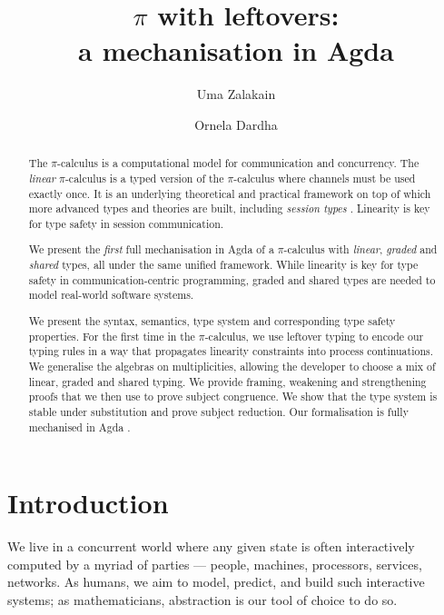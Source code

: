 \documentclass[a4paper,UKenglish,cleveref,autoref,thm-restate,authorcolumns]{lipics-v2019}
\title{$\pi$ with leftovers: \\ a mechanisation in Agda}
\author{Uma Zalakain}{University of Glasgow, Scotland}
       {u.zalakain.1@research.gla.ac.uk}{https://orcid.org/0000-0002-3268-9338}{}
\author{Ornela Dardha}{University of Glasgow, Scotland}
       {ornela.dardha@glasgow.ac.uk}{https://orcid.org/0000-0001-9927-7875}{}
\theoremstyle{definition}
\newcommand{\picalc}{$\pi$-calculus}
\begin{document}
\maketitle

\begin{abstract}
  The \picalc{} is a computational model for communication and concurrency.
  The \emph{linear} \picalc{} is a typed version of the \picalc{} where channels must be used exactly once.
  It is an underlying theoretical and practical framework on top of which more advanced types and theories are built, including \emph{session types} \cite{H93,THK94,HVK98}.
  Linearity is key for type safety in session communication.

  We present the \emph{first} full mechanisation in Agda of a \picalc{} with \emph{linear}, \emph{graded} and \emph{shared} types, all under the same unified framework.
  While linearity is key for type safety in communication-centric programming, graded and shared types are needed to model real-world software systems.
  
  We present the syntax, semantics, type system and corresponding type safety properties.
  For the first time in the \picalc{}, we use leftover typing \cite{Allais2018a} to encode our typing rules in a way that propagates linearity constraints into process continuations.
  We generalise the algebras on multiplicities, allowing the developer to choose a mix of linear, graded and shared typing.
  We provide framing, weakening and strengthening proofs that we then use to prove subject congruence.
  We show that the type system is stable under substitution and prove subject reduction.
%
  Our formalisation is fully mechanised in Agda \cite{Zalakain2020Agda}.
\end{abstract}


\section{Introduction}

We live in a concurrent world where any given state is often interactively computed by a myriad of parties --- people, machines, processors, services, networks.
As humans, we aim to model, predict, and build such interactive systems; as mathematicians, abstraction is our tool of choice to do so.
\end{document}
